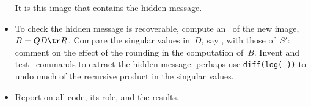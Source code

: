 \begin{exercise}
\begin{itemize}
It is this image that contains the hidden message.

\item To check the hidden message is recoverable, compute an \svd\ of the new image, \(B=QD\tr R\).
Compare the singular values in~\(D\), say \hlist{}, with those of~\(S'\): comment on the effect of the rounding in the computation of~\(B\).
Invent and test \script\ commands to extract the hidden message: perhaps use \verb|diff(log( ))| to undo much of the recursive product in the singular values.

\item Report on all code, its role, and the results.

\end{itemize}
\end{exercise}





